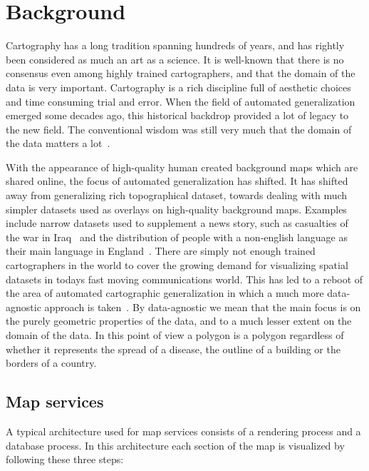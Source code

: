 \section{Background}
\label{sec:background}

Cartography has a long tradition spanning hundreds of years, and has rightly been considered as much an art as a science. It is well-known that there is no consensus even among highly trained cartographers, and that the domain of the data is very important. Cartography is a rich discipline full of aesthetic choices and time consuming trial and error. When the field of automated generalization emerged some decades ago, this historical backdrop provided a lot of legacy to the new field. The conventional wisdom was still very much that the domain of the data matters a lot~\cite{a bunch of papers}.

With the appearance of high-quality human created background maps which are shared online, the focus of automated generalization has shifted. It has shifted away from generalizing rich topographical dataset, towards dealing with much simpler datasets used as overlays on high-quality background maps. Examples include narrow datasets used to supplement a news story, such as casualties of the war in Iraq~\cite{datablog1} and the distribution of people with a non-english language as their main language in England~\cite{datablog2}. There are simply not enough trained cartographers in the world to cover the growing demand for visualizing spatial datasets in todays fast moving communications world. This has led to a reboot of the area of automated cartographic generalization in which a much more data-agnostic approach is taken~\cite{fusiontables}. By data-agnostic we mean that the main focus is on the purely geometric properties of the data, and to a much lesser extent on the domain of the data. In this point of view a polygon is a polygon regardless of whether it represents the spread of a disease, the outline of a building or the borders of a country.

\subsection{Map services}

A typical architecture used for map services consists of a rendering process and a database process. In this architecture each section of the map is visualized by following these three steps:

